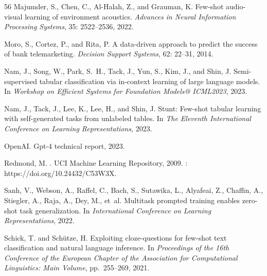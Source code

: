 \documentclass{article}
\theoremstyle{plain}
\theoremstyle{definition}
\theoremstyle{remark}
\begin{document}
\begin{thebibliography}{56}
Majumder, S., Chen, C., Al-Halah, Z., and Grauman, K.
\newblock Few-shot audio-visual learning of environment acoustics.
\newblock \emph{Advances in Neural Information Processing Systems},
  35: 2522--2536, 2022.

Moro, S., Cortez, P., and Rita, P.
\newblock A data-driven approach to predict the success of bank telemarketing.
\newblock \emph{Decision Support Systems}, 62: 22--31, 2014.

Nam, J., Song, W., Park, S.~H., Tack, J., Yun, S., Kim, J., and Shin, J.
\newblock Semi-supervised tabular classification via in-context learning of
  large language models.
\newblock In \emph{Workshop on Efficient Systems for Foundation Models@
  ICML2023}, 2023{}.

Nam, J., Tack, J., Lee, K., Lee, H., and Shin, J.
\newblock Stunt: Few-shot tabular learning with self-generated tasks from
  unlabeled tables.
\newblock In \emph{The Eleventh International Conference on Learning
  Representations}, 2023{}.

OpenAI.
\newblock Gpt-4 technical report, 2023.

Redmond, M.
.
\newblock UCI Machine Learning Repository, 2009.
: https://doi.org/10.24432/C53W3X.

Sanh, V., Webson, A., Raffel, C., Bach, S., Sutawika, L., Alyafeai, Z.,
  Chaffin, A., Stiegler, A., Raja, A., Dey, M., et~al.
\newblock Multitask prompted training enables zero-shot task generalization.
\newblock In \emph{International Conference on Learning Representations}, 2022.

Schick, T. and Sch{\"u}tze, H.
\newblock Exploiting cloze-questions for few-shot text classification and
  natural language inference.
\newblock In \emph{Proceedings of the 16th Conference of the European Chapter
  of the Association for Computational Linguistics: Main Volume}, pp.\
  255--269, 2021.


\end{thebibliography}
\end{document}
